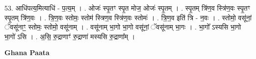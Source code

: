 \documentclass[17pt]{extarticle}
\begin{document}
53. आधि॑पत्य॒मित्याधि॑ - प॒त्य॒म् । . ओजः॑ स्पृ॒तꣳ स्पृ॒त मोज॒ ओजः॑ स्पृ॒तम् । . स्पृ॒तम् त्रि॑ण॒व स्त्रि॑ण॒वः स्पृ॒तꣳ स्पृ॒तम् त्रि॑ण॒वः । . त्रि॒ण॒वः स्तोमः॒ स्तोम॑ स्त्रिण॒व स्त्रि॑ण॒वः स्तोमः॑ । . त्रि॒ण॒व इति॑ त्रि - न॒वः । . स्तोमो॒ वसू॑नां॒ ॅवसू॑नाꣳ॒॒ स्तोमः॒ स्तोमो॒ वसू॑नाम् । . वसू॑नाम् भा॒गो भा॒गो वसू॑नां॒ ॅवसू॑नाम् भा॒गः । . भा॒गो᳚ ऽस्यसि भा॒गो भा॒गो॑ ऽसि । . अ॒सि॒ रु॒द्राणाꣳ॑ रु॒द्राणा॑ मस्यसि रु॒द्राणा᳚म् । \newline

\textbf{Ghana Paata } \newline
\end{document}

